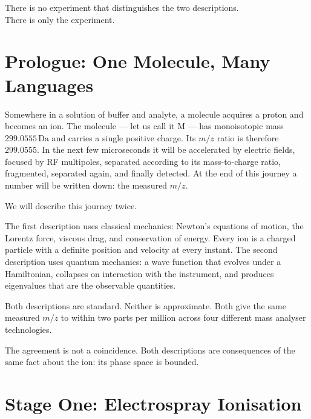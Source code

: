%

\epigraph{%
  There is no experiment that distinguishes the two descriptions.\\
  There is only the experiment.%
}{}

\section{Prologue: One Molecule, Many Languages}
\label{sec:ch1-prologue}

Somewhere in a solution of buffer and analyte, a molecule acquires a proton
and becomes an ion.
The molecule --- let us call it M --- has monoisotopic mass $299.0555\,\mathrm{Da}$
and carries a single positive charge.
Its $m/z$ ratio is therefore $299.0555$.
In the next few microseconds it will be accelerated by electric fields,
focused by RF multipoles, separated according to its mass-to-charge ratio,
fragmented, separated again, and finally detected.
At the end of this journey a number will be written down: the measured $m/z$.

We will describe this journey twice.

The first description uses classical mechanics: Newton's equations of motion,
the Lorentz force, viscous drag, and conservation of energy.
Every ion is a charged particle with a definite position and velocity at every
instant.
The second description uses quantum mechanics: a wave function that evolves
under a Hamiltonian, collapses on interaction with the instrument, and produces
eigenvalues that are the observable quantities.

Both descriptions are standard.
Neither is approximate.
Both give the same measured $m/z$ to within two parts per million across four
different mass analyser technologies.

The agreement is not a coincidence.
Both descriptions are consequences of the same fact about the ion: its phase
space is bounded.

\section{Stage One: Electrospray Ionisation}
\label{sec:ch1-esi}


